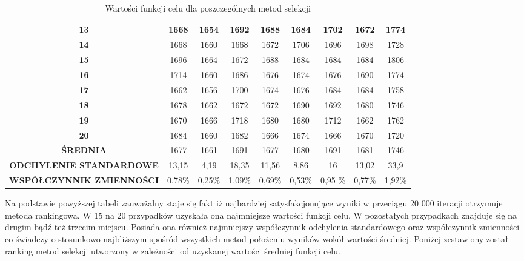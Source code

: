 \begin{itemize}
\begin{table}[h!]
\begin{center}
{\begin{tabular}{|c|c|c|c|c|c|c|c|c|}
\hline
 \textbf{13}&1668&\color{green}\textbf{1654}&1692&1688&1684&1702&1672&1774 \\
\hline
 \textbf{14}&1668&1660&1668&1672&1706&1696&1698&1728\\
\hline
 \textbf{15}&1696&1664&1672&1688&1684&1684&1684&1806\\
\hline
 \textbf{16}&1714&1660&1686&1676&1674&1676&1690&1774\\
\hline
 \textbf{17}&1662&1656&1700&1674&1676&1684&1684&1758 \\
\hline
 \textbf{18}&1678&1662&1672&1672&1690&1692&1680&1746\\
\hline
 \textbf{19}&1670&1666&1718&1680&1680&1712&1662&1762\\
\hline
 \textbf{20}&1684&1660&1682&1666&1674&1666&1670&1720\\
\hline
 \textbf{ŚREDNIA}&1677&1661&1691&1677&1680&1691&1681&1746\\
\hline
 \textbf{ODCHYLENIE STANDARDOWE}&13,15&4,19&18,35&11,56&8,86&16&13,02&33,9\\
\hline
 \textbf{WSPÓŁCZYNNIK ZMIENNOŚCI}&0,78\%&0,25\%&1,09\%&0,69\%&0,53\%&0,95	\%&0,77\%&1,92\%\\
\hline
\end{tabular}}
\caption{Wartości funkcji celu dla poszczególnych metod selekcji}
\label{instancja1}
\end{center}
\end{table}


Na podstawie powyższej tabeli zauważalny staje się fakt iż najbardziej satysfakcjonujące wyniki w przeciągu 20 000 iteracji otrzymuje metoda rankingowa. W 15 na 20 przypadków uzyskała ona najmniejsze wartości funkcji celu. W pozostałych przypadkach znajduje się na drugim bądź też trzecim miejscu. Posiada ona również najmniejszy współczynnik odchylenia standardowego oraz współczynnik zmienności co świadczy o stosunkowo najbliższym spośród wszystkich metod położeniu wyników wokół wartości średniej. Poniżej zestawiony został ranking metod selekcji utworzony w zależności od uzyskanej wartości średniej funkcji celu.\\




\end{itemize}
